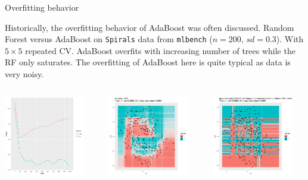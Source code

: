 \begin{vbframe}{Overfitting behavior}

Historically, the overfitting behavior of AdaBoost was often discussed.
Random Forest versus AdaBoost on \texttt{Spirals} data from \texttt{mlbench} ($n=200$, $sd=0.3$).
With $5 \times 5$ repeated CV.
AdaBoost overfits with increasing number of trees while the RF only saturates.
The overfitting of AdaBoost here is quite typical as data is very noisy.

\begin{columns}
\begin{column}{0.33\textwidth}
\begin{center}
\includegraphics[width=3.5cm]{figure_man/overfitting_plot_ntree.png}
\end{center}
\end{column}
\begin{column}{0.33\textwidth}
\begin{center}
\includegraphics[width=3.5cm]{figure_man/overfitting_plot_rf.png}
\end{center}
\end{column}
\begin{column}{0.33\textwidth}
\begin{center}
\includegraphics[width=3.5cm]{figure_man/overfitting_plot_boost.png}
\end{center}
\end{column}
\end{columns}

\lz


\end{vbframe}










